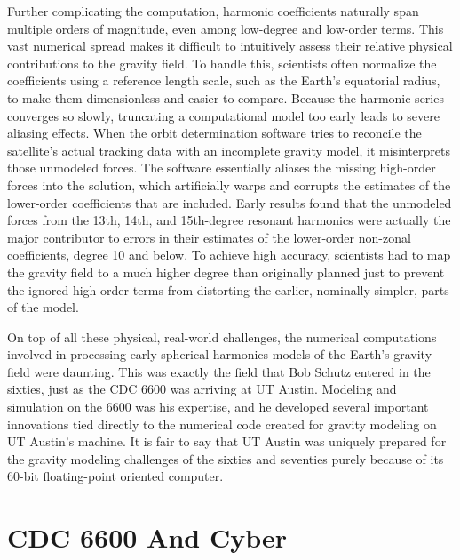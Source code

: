 Further complicating the computation, harmonic coefficients naturally span multiple orders of magnitude, even among low-degree and low-order terms. This vast numerical spread makes it difficult to intuitively assess their relative physical contributions to the gravity field. To handle this, scientists often normalize the coefficients using a reference length scale, such as the Earth's equatorial radius, to make them dimensionless and easier to compare. Because the harmonic series converges so slowly, truncating a computational model too early leads to severe aliasing effects. When the orbit determination software tries to reconcile the satellite's actual tracking data with an incomplete gravity model, it misinterprets those unmodeled forces. The software essentially aliases the missing high-order forces into the solution, which artificially warps and corrupts the estimates of the lower-order coefficients that are included. Early results found that the unmodeled forces from the 13th, 14th, and 15th-degree resonant harmonics were actually the major contributor to errors in their estimates of the lower-order non-zonal coefficients, degree 10 and below. To achieve high accuracy, scientists had to map the gravity field to a much higher degree than originally planned just to prevent the ignored high-order terms from distorting the earlier, nominally simpler, parts of the model.

On top of all these physical, real-world challenges, the numerical computations involved in processing early spherical harmonics models of the Earth’s gravity field were daunting. This was exactly the field that Bob Schutz entered in the sixties, just as the CDC 6600 was arriving at UT Austin. Modeling and simulation on the 6600 was his expertise, and he developed several important innovations tied directly to the numerical code created for gravity modeling on UT Austin’s machine. It is fair to say that UT Austin was uniquely prepared for the gravity modeling challenges of the sixties and seventies purely because of its 60-bit floating-point oriented computer. 

\section{CDC 6600 And Cyber}

